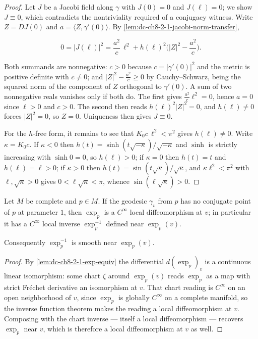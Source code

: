 \begin{proof}

\sketch
  Let $J$ be a Jacobi field along $\gamma$ with $J(0)=0$ and $J(\ell)=0$; we show $J\equiv0$,
  which contradicts the nontriviality required of a conjugacy witness. Write $Z=DJ(0)$ and
  $a=\langle Z,\gamma'(0)\rangle$. By \cref{lem:dc-ch8-2-1-jacobi-norm-transfer},

  $$
  0=|J(\ell)|^2=\frac{a^2}{c}\,\ell^2+h(\ell)^2\Big(|Z|^2-\frac{a^2}{c}\Big).
  $$

  Both summands are nonnegative: $c>0$ because $c=|\gamma'(0)|^2$ and the metric is positive
  definite with $c\neq0$; and $|Z|^2-\frac{a^2}{c}\geq0$ by Cauchy--Schwarz, being the squared
  norm of the component of $Z$ orthogonal to $\gamma'(0)$. A sum of two nonnegative reals
  vanishes only if both do. The first gives $\frac{a^2}{c}\ell^2=0$, hence $a=0$ since
  $\ell>0$ and $c>0$. The second then reads $h(\ell)^2|Z|^2=0$, and $h(\ell)\neq0$ forces
  $|Z|^2=0$, so $Z=0$. Uniqueness then gives $J\equiv0$.

  For the $h$-free form, it remains to see that $K_0c\,\ell^2<\pi^2$ gives $h(\ell)\neq0$.
  Write $\kappa=K_0c$. If $\kappa<0$ then $h(t)=\sinh(t\sqrt{-\kappa})/\sqrt{-\kappa}$ and
  $\sinh$ is strictly increasing with $\sinh 0=0$, so $h(\ell)>0$; if $\kappa=0$ then
  $h(t)=t$ and $h(\ell)=\ell>0$; if $\kappa>0$ then $h(t)=\sin(t\sqrt\kappa)/\sqrt\kappa$, and
  $\kappa\ell^2<\pi^2$ with $\ell,\sqrt\kappa>0$ gives $0<\ell\sqrt\kappa<\pi$, whence
  $\sin(\ell\sqrt\kappa)>0$.
\end{proof}

\begin{lemma}
  \label{lem:dc-ch8-2-1-exp-local-diffeo}


  Let $M$ be complete and $p\in M$. If the geodesic $\gamma_v$ from $p$ has no conjugate point
  of $p$ at parameter $1$, then $\exp_p$ is a $C^\infty$ local diffeomorphism at $v$; in
  particular it has a $C^\infty$ local inverse $\exp_p^{-1}$ defined near $\exp_p(v)$.

  Consequently $\exp_p^{-1}$ is smooth near $\exp_p(v)$.
\end{lemma}
\begin{proof}

\sketch
  By \cref{lem:dc-ch8-2-1-exp-equiv} the differential $d(\exp_p)_v$ is a continuous linear
  isomorphism: some chart $\zeta$ around $\exp_p(v)$ reads $\exp_p$ as a map with strict
  Fréchet derivative an isomorphism at $v$. That chart reading is $C^\infty$ on an open
  neighborhood of $v$, since $\exp_p$ is globally $C^\infty$ on a complete manifold, so the
  inverse function theorem makes the reading a local diffeomorphism at $v$. Composing with the
  chart inverse --- itself a local diffeomorphism --- recovers $\exp_p$ near $v$, which is
  therefore a local diffeomorphism at $v$ as well.
\end{proof}

